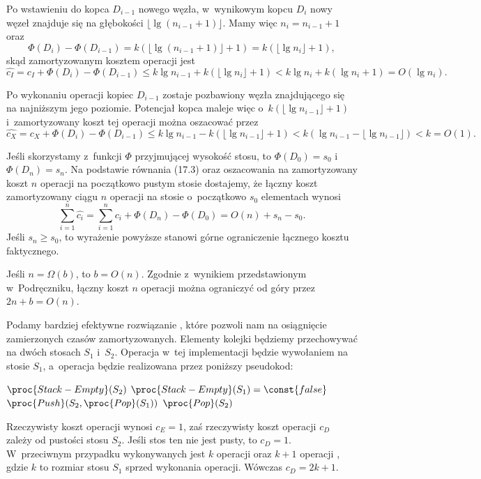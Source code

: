 Po wstawieniu do kopca $D_{i-1}$ nowego węzła, w~wynikowym kopcu $D_i$ nowy węzeł znajduje się na głębokości $\lfloor\lg(n_{i-1}+1)\rfloor$.
Mamy więc $n_i=n_{i-1}+1$ oraz
\[
	\Phi(D_i)-\Phi(D_{i-1}) = k(\lfloor\lg(n_{i-1}+1)\rfloor+1) = k(\lfloor\lg n_i\rfloor+1),
\]
skąd zamortyzowanym kosztem operacji  jest
\[
	\widehat{c_I} = c_I+\Phi(D_i)-\Phi(D_{i-1}) \le k\lg n_{i-1}+k(\lfloor\lg n_i\rfloor+1) < k\lg n_i+k(\lg n_i+1) = O(\lg n_i).
\]

Po wykonaniu operacji  kopiec $D_{i-1}$ zostaje pozbawiony węzła znajdującego się na najniższym jego poziomie.
Potencjał kopca maleje więc o~$k(\lfloor\lg n_{i-1}\rfloor+1)$ i~zamortyzowany koszt tej operacji można oszacować przez
\[
	\widehat{c_X} = c_X+\Phi(D_i)-\Phi(D_{i-1}) \le k\lg n_{i-1}-k(\lfloor\lg n_{i-1}\rfloor+1) < k(\lg n_{i-1}-\lfloor\lg n_{i-1}\rfloor) < k = O(1).
\]

\exercise %
Jeśli skorzystamy z~funkcji $\Phi$ przyjmującej wysokość stosu, to $\Phi(D_0)=s_0$ i~$\Phi(D_n)=s_n$.
Na podstawie równania (17.3) oraz oszacowania na zamortyzowany koszt $n$ operacji na początkowo pustym stosie dostajemy, że łączny koszt zamortyzowany ciągu $n$ operacji na stosie o~początkowo $s_0$ elementach wynosi
\[
	\sum_{i=1}^n\widehat{c_i} = \sum_{i=1}^nc_i+\Phi(D_n)-\Phi(D_0) = O(n)+s_n-s_0.
\]
Jeśli $s_n\ge s_0$, to wyrażenie powyższe stanowi górne ograniczenie łącznego kosztu faktycznego.

\exercise %
Jeśli $n=\Omega(b)$, to $b=O(n)$.
Zgodnie z~wynikiem przedstawionym w~Podręczniku, łączny koszt $n$ operacji  można ograniczyć od góry przez $2n+b=O(n)$.

\exercise %
Podamy bardziej efektywne rozwiązanie , które pozwoli nam na osiągnięcie zamierzonych czasów zamortyzowanych.
Elementy kolejki będziemy przechowywać na dwóch stosach $S_1$ i~$S_2$.
Operacja  w~tej implementacji będzie wywołaniem  na stosie $S_1$, a~operacja  będzie realizowana przez poniższy pseudokod:
\begin{codebox}
\li	\If $\proc{Stack-Empty}(S_2)$
\li		\Then \While $\proc{Stack-Empty}(S_1)=\const{false}$
\li				\Do $\proc{Push}(S_2,\proc{Pop}(S_1))$
				\End
		\End
\li	\Return $\proc{Pop}(S_2)$
\end{codebox}
Rzeczywisty koszt operacji  wynosi $c_E=1$, zaś rzeczywisty koszt operacji  $c_D$ zależy od pustości stosu $S_2$.
Jeśli stos ten nie jest pusty, to $c_D=1$.
W~przeciwnym przypadku wykonywanych jest $k$ operacji  oraz $k+1$ operacji , gdzie $k$ to rozmiar stosu $S_1$ sprzed wykonania operacji.
Wówczas $c_D=2k+1$.

